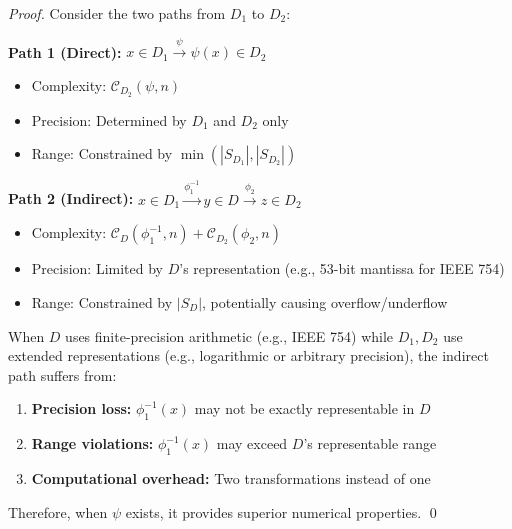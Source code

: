\documentclass[11pt]{article}
\theoremstyle{definition}
\begin{document}
\begin{proof}
Consider the two paths from $D_1$ to $D_2$:

\textbf{Path 1 (Direct):} $x \in D_1 \xrightarrow{\psi} \psi(x) \in D_2$
\begin{itemize}
\item Complexity: $\mathcal{C}_{D_2}(\psi, n)$
\item Precision: Determined by $D_1$ and $D_2$ only
\item Range: Constrained by $\min(|S_{D_1}|, |S_{D_2}|)$
\end{itemize}

\textbf{Path 2 (Indirect):} $x \in D_1 \xrightarrow{\phi_1^{-1}} y \in D \xrightarrow{\phi_2} z \in D_2$
\begin{itemize}
\item Complexity: $\mathcal{C}_{D}(\phi_1^{-1}, n) + \mathcal{C}_{D_2}(\phi_2, n)$
\item Precision: Limited by $D$'s representation (e.g., 53-bit mantissa for IEEE 754)
\item Range: Constrained by $|S_D|$, potentially causing overflow/underflow
\end{itemize}

When $D$ uses finite-precision arithmetic (e.g., IEEE 754) while $D_1, D_2$ use extended representations (e.g., logarithmic or arbitrary precision), the indirect path suffers from:
\begin{enumerate}
\item \textbf{Precision loss:} $\phi_1^{-1}(x)$ may not be exactly representable in $D$
\item \textbf{Range violations:} $\phi_1^{-1}(x)$ may exceed $D$'s representable range
\item \textbf{Computational overhead:} Two transformations instead of one
\end{enumerate}

Therefore, when $\psi$ exists, it provides superior numerical properties. \qed
\end{proof}
\end{document}
